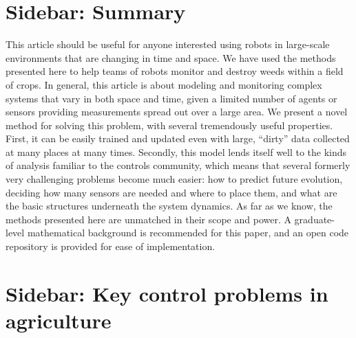 \documentclass[letterpaper,12pt,peerreviewca,draftcls]{IEEEtran}
\begin{document}
\processdelayedfloats
\sidebars


\renewcommand{\thealgorithm}{S\arabic{algorithm}} 
\setcounter{algorithm}{0}







\clearpage

\section[Nontechnical summary]{Sidebar: Summary}\label{sb:summary}

This article should be useful for anyone interested using robots in large-scale environments that are changing in time and space. We have used the methods presented here to help teams of robots  monitor and destroy weeds within a field of crops. In general, this article is about modeling and monitoring complex systems that vary in both space and time, given a limited number of agents or sensors providing measurements spread out over a large area. We present a novel method for solving this problem, with several tremendously useful properties. First, it can be easily trained and updated even with large, ``dirty'' data collected at many places at many times. Secondly, this model lends itself well to the kinds of analysis familiar to the controls community, which means that several formerly very challenging problems become much easier: how to predict future evolution, deciding how many sensors are needed and where to place them, and what are the basic structures underneath the system dynamics. As far as we know, the methods presented here are unmatched in their scope and power. A graduate-level mathematical background is recommended for this paper, and an open code repository is provided for ease of implementation.






\clearpage
%

\section[How can control engineers help agriculture?]{Sidebar: Key control problems in agriculture}\label{sb:ag}
\end{document}
